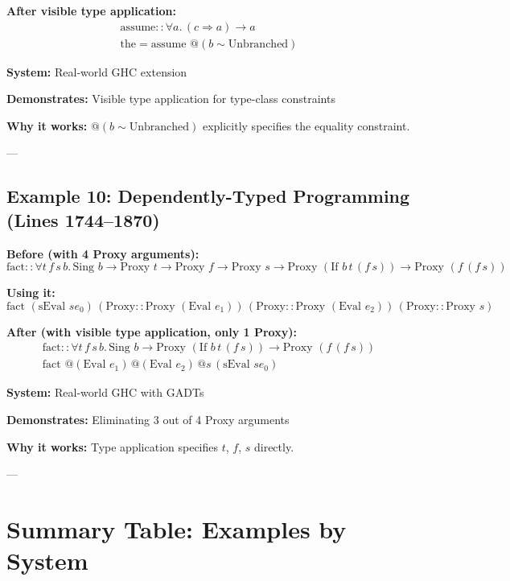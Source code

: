 \documentclass[11pt,a4paper]{article}
\begin{document}
\textbf{After visible type application:}
\[
\begin{array}{l}
\text{assume} :: \forall a.\, (c \Rightarrow a) \to a \\[4pt]
\text{the} = \text{assume } @(b \sim \text{Unbranched})
\end{array}
\]

\textbf{System:} Real-world GHC extension

\textbf{Demonstrates:} Visible type application for type-class constraints

\textbf{Why it works:} $@(b \sim \text{Unbranched})$ explicitly specifies the equality constraint.

---

\subsection{Example 10: Dependently-Typed Programming (Lines 1744--1870)}

\textbf{Before (with 4 Proxy arguments):}
\[
\text{fact} :: \forall t\, f\, s\, b.\, \text{Sing } b \to \text{Proxy } t \to \text{Proxy } f \to \text{Proxy } s \to \text{Proxy } (\text{If } b\, t\, (f\, s)) \to \text{Proxy } (f\, (f\, s))
\]

\textbf{Using it:}
\[
\text{fact } (\text{sEval } se_0)\, (\text{Proxy} :: \text{Proxy } (\text{Eval } e_1))\, (\text{Proxy} :: \text{Proxy } (\text{Eval } e_2))\, (\text{Proxy} :: \text{Proxy } s)
\]

\textbf{After (with visible type application, only 1 Proxy):}
\[
\begin{array}{l}
\text{fact} :: \forall t\, f\, s\, b.\, \text{Sing } b \to \text{Proxy } (\text{If } b\, t\, (f\, s)) \to \text{Proxy } (f\, (f\, s)) \\[4pt]
\text{fact } @(\text{Eval } e_1)\, @(\text{Eval } e_2)\, @s\, (\text{sEval } se_0)
\end{array}
\]

\textbf{System:} Real-world GHC with GADTs

\textbf{Demonstrates:} Eliminating 3 out of 4 Proxy arguments

\textbf{Why it works:} Type application specifies $t$, $f$, $s$ directly.

---

\section{Summary Table: Examples by System}
\end{document}
